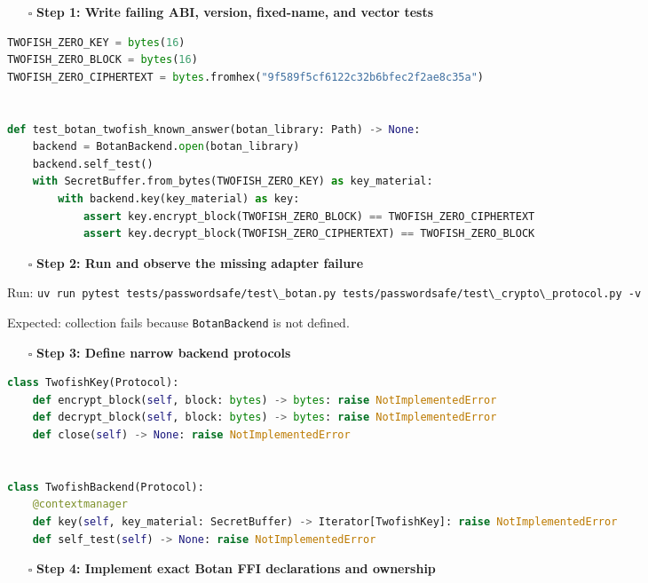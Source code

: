 \documentclass[
  letterpaper,
]{article}
\newcommand{\passthrough}[1]{#1}
\providecommand{\tightlist}{%
  \setlength{\itemsep}{0pt}\setlength{\parskip}{0pt}}
\begin{document}
\begin{itemize}
\tightlist
\item[$\square$]
  \textbf{Step 1: Write failing ABI, version, fixed-name, and vector tests}
\end{itemize}

\begin{lstlisting}[language=Python]
TWOFISH_ZERO_KEY = bytes(16)
TWOFISH_ZERO_BLOCK = bytes(16)
TWOFISH_ZERO_CIPHERTEXT = bytes.fromhex("9f589f5cf6122c32b6bfec2f2ae8c35a")


def test_botan_twofish_known_answer(botan_library: Path) -> None:
    backend = BotanBackend.open(botan_library)
    backend.self_test()
    with SecretBuffer.from_bytes(TWOFISH_ZERO_KEY) as key_material:
        with backend.key(key_material) as key:
            assert key.encrypt_block(TWOFISH_ZERO_BLOCK) == TWOFISH_ZERO_CIPHERTEXT
            assert key.decrypt_block(TWOFISH_ZERO_CIPHERTEXT) == TWOFISH_ZERO_BLOCK
\end{lstlisting}

\begin{itemize}
\tightlist
\item[$\square$]
  \textbf{Step 2: Run and observe the missing adapter failure}
\end{itemize}

Run:
\passthrough{\lstinline!uv run pytest tests/passwordsafe/test\_botan.py tests/passwordsafe/test\_crypto\_protocol.py -v!}

Expected: collection fails because \nolinkurl{BotanBackend} is not defined.

\begin{itemize}
\tightlist
\item[$\square$]
  \textbf{Step 3: Define narrow backend protocols}
\end{itemize}

\begin{lstlisting}[language=Python]
class TwofishKey(Protocol):
    def encrypt_block(self, block: bytes) -> bytes: raise NotImplementedError
    def decrypt_block(self, block: bytes) -> bytes: raise NotImplementedError
    def close(self) -> None: raise NotImplementedError


class TwofishBackend(Protocol):
    @contextmanager
    def key(self, key_material: SecretBuffer) -> Iterator[TwofishKey]: raise NotImplementedError
    def self_test(self) -> None: raise NotImplementedError
\end{lstlisting}

\begin{itemize}
\tightlist
\item[$\square$]
  \textbf{Step 4: Implement exact Botan FFI declarations and ownership}
\end{itemize}
\end{document}

